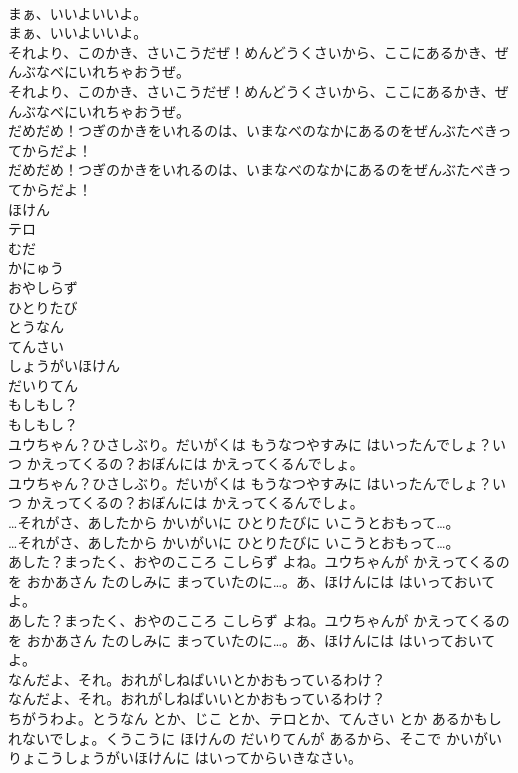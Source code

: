 \documentclass[8pt]{extreport}
\begin{document}
\begin{CJK}{UTF8}{min}
\\	まぁ、いいよいいよ。
\\	まぁ、いいよいいよ。
\\	それより、このかき、さいこうだぜ！めんどうくさいから、ここにあるかき、ぜんぶなべにいれちゃおうぜ。
\\	それより、このかき、さいこうだぜ！めんどうくさいから、ここにあるかき、ぜんぶなべにいれちゃおうぜ。
\\	だめだめ！つぎのかきをいれるのは、いまなべのなかにあるのをぜんぶたべきってからだよ！
\\	だめだめ！つぎのかきをいれるのは、いまなべのなかにあるのをぜんぶたべきってからだよ！
\\	ほけん
\\	テロ
\\	むだ
\\	かにゅう
\\	おやしらず
\\	ひとりたび
\\	とうなん
\\	てんさい
\\	しょうがいほけん
\\	だいりてん
\\	もしもし？
\\	もしもし？
\\	ユウちゃん？ひさしぶり。だいがくは もうなつやすみに はいったんでしょ？いつ かえってくるの？おぼんには かえってくるんでしょ。
\\	ユウちゃん？ひさしぶり。だいがくは もうなつやすみに はいったんでしょ？いつ かえってくるの？おぼんには かえってくるんでしょ。
\\	…それがさ、あしたから かいがいに ひとりたびに いこうとおもって…。
\\	…それがさ、あしたから かいがいに ひとりたびに いこうとおもって…。
\\	あした？まったく、おやのこころ こしらず よね。ユウちゃんが かえってくるのを おかあさん たのしみに まっていたのに…。あ、ほけんには はいっておいてよ。
\\	あした？まったく、おやのこころ こしらず よね。ユウちゃんが かえってくるのを おかあさん たのしみに まっていたのに…。あ、ほけんには はいっておいてよ。
\\	なんだよ、それ。おれがしねばいいとかおもっているわけ？
\\	なんだよ、それ。おれがしねばいいとかおもっているわけ？
\\	ちがうわよ。とうなん とか、じこ とか、テロとか、てんさい とか あるかもしれないでしょ。くうこうに ほけんの だいりてんが あるから、そこで かいがいりょこうしょうがいほけんに はいってからいきなさい。

\end{CJK}
\end{document}
